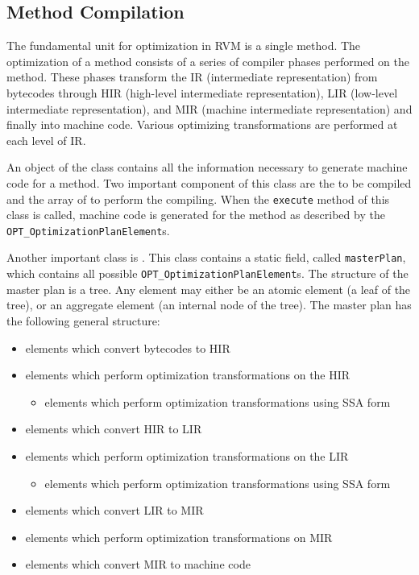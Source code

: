\subsection{Method Compilation}
\label{sec:optdriver}
The fundamental unit for optimization in RVM is a single method. 
The optimization of a method consists of a series of 
compiler phases performed on the method. These 
phases transform the  
IR (intermediate representation) from bytecodes through 
HIR (high-level intermediate representation), 
LIR (low-level intermediate representation), and 
MIR (machine intermediate representation) and finally into machine code. 
Various optimizing transformations are performed at each level of IR.

An object of the class 
contains all the  
information necessary to generate machine code for a method. Two
important component of this class are the 
to be
compiled and the
array of 
 to perform the compiling.
When the {\tt execute} method  of this class is called, machine code
is generated for the method as described by the 
{\tt OPT\_OptimizationPlanElement}s.

Another important class is 
.  
This class
contains a static field, called {\tt masterPlan}, which contains all
possible {\tt OPT\_OptimizationPlanElement}s.
The structure of the master plan is 
a tree. Any element may either be an atomic element (a leaf of the 
tree), or an aggregate element (an internal node of the tree).
The master plan has the following general structure:

\begin{itemize}
\item elements which convert bytecodes to HIR
\item elements which perform optimization transformations on the HIR
   \begin{itemize}
   \item elements which perform optimization transformations using SSA form
   \end{itemize}
\item elements which convert HIR to LIR
\item elements which perform optimization transformations on the LIR
   \begin{itemize}
   \item elements which perform optimization transformations using SSA form
   \end{itemize}
\item elements which convert LIR to MIR
\item elements which perform optimization transformations on MIR 
\item elements which convert MIR to machine code
\end{itemize}


